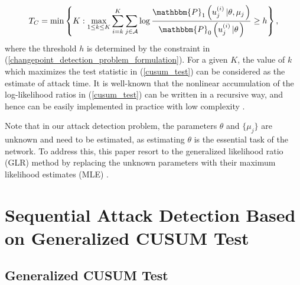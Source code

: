 \documentclass[11pt, draftclsnofoot, onecolumn]{IEEEtran}
\newcommand{\bbP}{\mathbbm{P}}
\begin{document}
\begin{equation} \label{cusum_test}
{T_C} = \min \left\{ {K:\mathop {\max }\limits_{1 \le k \le K} \sum\limits_{i = k}^K {\sum\limits_{j \in {\cal A}} {\log \frac{{{\bbP_1}\left( {u_j^{(i)}\left| {\theta,  {\mu _j}} \right.} \right)}}{{{\bbP_0}\left( {u_j^{(i)}\left| \theta  \right.} \right)}} \ge h} } } \right\},
\end{equation}
where the threshold $h$ is determined by the constraint in (\ref{changepoint_detection_problem_formulation}). For a given $K$, the value of $k$ which maximizes the test statistic in (\ref{cusum_test}) can be considered as the estimate of attack time. It is well-known that the nonlinear accumulation of the log-likelihood ratios in (\ref{cusum_test}) can be written in a recursive way, and hence can be easily implemented in practice with low complexity \cite{basseville1993detection, tartakovsky2014sequential}. 

Note that in our attack detection problem, the parameters $\theta$ and $\{\mu_j\}$ are unknown and need to be estimated, as estimating $\theta$ is the essential task of the network. To address this, this paper resort to the generalized likelihood   ratio (GLR) method by replacing   the unknown parameters with their maximum likelihood estimates (MLE) \cite{basseville1993detection, tartakovsky2014sequential}.

\section{Sequential Attack Detection Based on Generalized CUSUM Test}
\label{Section_GCUSUM}

\subsection{Generalized CUSUM Test}
\end{document}
